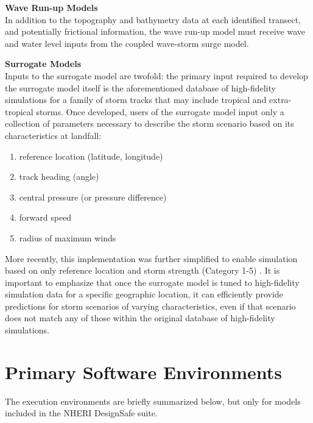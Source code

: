 \noindent\textbf{Wave Run-up Models} \\In addition to the topography and bathymetry data at each identified transect, and potentially frictional information, the wave run-up model must receive wave and water level inputs from the coupled wave-storm surge model.
\newline

\noindent\textbf{Surrogate Models} \\Inputs to the surrogate model are twofold: the primary input required to develop the surrogate model itself is the aforementioned database of high-fidelity simulations for a family of storm tracks that may include tropical and extra-tropical storms. Once developed, users of the surrogate model input only a collection of parameters necessary to describe the storm scenario based on its characteristics at landfall: 

\begin{enumerate}
    \item reference location (latitude, longitude)
    \item track heading (angle)
    \item central pressure (or pressure difference)
    \item forward speed
    \item radius of maximum winds
\end{enumerate}

More recently, this implementation was further simplified to enable simulation based on only reference location and storm strength (Category 1-5) \citep{njcoast2018a}. It is important to emphasize that once the surrogate model is tuned to high-fidelity simulation data for a specific geographic location, it can efficiently provide predictions for storm scenarios of varying characteristics, even if that scenario does not match any of those within the original database of high-fidelity simulations. 

\section{Primary Software Environments}
\label{sec:storm_surge_tools}

The execution environments are briefly summarized below, but only for models included in the NHERI DesignSafe suite. 
\newline

